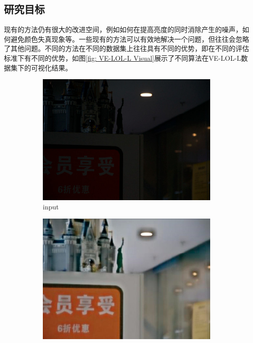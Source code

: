 \documentclass[a4paper]{ctexart}
\begin{document}
	\subsection{研究目标}
	
	现有的方法仍有很大的改进空间，例如如何在提高亮度的同时消除产生的噪声，如何避免颜色失真现象等。一些现有的方法可以有效地解决一个问题，但往往会忽略了其他问题。不同的方法在不同的数据集上往往具有不同的优势，即在不同的评估标准下有不同的优势，如图\ref{fig: VE-LOL-L Visual}展示了不同算法在VE-LOL-L数据集\cite{liu2021benchmarking}下的可视化结果。
	
	\begin{figure}[htbp]
		\centering
		\begin{subfigure}{0.17\columnwidth}
			\includegraphics[width=\linewidth]{picture/LLIE/VE-LOL-L/input}
			\captionsetup{font=scriptsize}
			\caption*{input \\ \quad }
			\label{fig: input}
		\end{subfigure}
		\begin{subfigure}{0.17\columnwidth}
			\includegraphics[width=\linewidth]{picture/LLIE/VE-LOL-L/LLNet}

\end{subfigure}
\end{figure}
\end{document}
